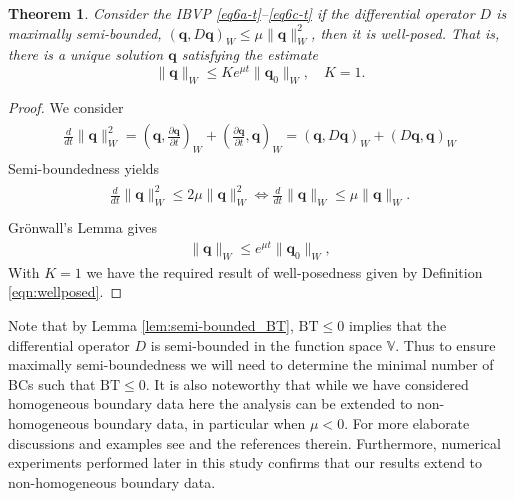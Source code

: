 \documentclass{article}
\numberwithin{equation}{section}
\newtheorem{theorem}{Theorem}
\theoremstyle{definition}
\begin{document}
\begin{theorem}\label{thm:swp}
    Consider the IBVP \eqref{eq6a-t}--\eqref{eq6c-t} if the differential operator $D$ is maximally semi-bounded, $(\mathbf{q}, D\mathbf{q})_W \leq \mu \|\mathbf{q}\|^2_W$, then it is  well-posed. That is, there is a unique solution $\mathbf{q}$ satisfying the estimate
    $$\| \mathbf{q}\|_W \leq K e^{\mu t}\| \mathbf{q}_0\|_W , \quad {K =1}.$$
\end{theorem}
\begin{proof}
    We consider 
\begin{align}
\begin{split}  
     \frac{d}{dt} \| \mathbf{q}\|_W^2   = \left(\mathbf{q},\frac{\partial\mathbf{q}}{\partial t}\right)_W  + \left(\frac{\partial\mathbf{q}}{\partial t}, \mathbf{q}\right)_W =\left(\mathbf{q},D\mathbf{q}\right)_W + \left(D\mathbf{q}, \mathbf{q}\right)_W  
\end{split}
    \end{align}
    Semi-boundedness  yields
\begin{align}
\begin{split}  
     \frac{d}{dt} \| \mathbf{q}\|_W^2   \leq 2\mu \| \mathbf{q} \|^2_W  \iff
    \frac{d}{dt} \| \mathbf{q} \|_W \leq  \mu \| \mathbf{q}\|_W . \\
\end{split}
    \end{align}
    Gr\"onwall's Lemma  gives
    \begin{align}
    \|\mathbf{q}\|_W \leq e^{\mu t}\|\mathbf{q}_0\|_W , 
\end{align}
With $K=1$ we have the required result of well-posedness given by Definition \ref{eqn:wellposed}.
\end{proof}
%
\noindent
Note that by Lemma \ref{lem:semi-bounded_BT}, $\mathrm{BT} \le 0$ implies that the differential operator $D$ is semi-bounded in the function space $\mathbb{V}$. Thus to ensure maximally semi-boundedness we will need to determine the minimal number of BCs such that $\mathrm{BT} \le 0$.
It is also noteworthy that while we have considered homogeneous boundary data here the analysis can be extended to non-homogeneous boundary data, in particular when $\mu < 0$. For more elaborate discussions and  examples see  \cite{nordstrom2022linear,GHADER20141,NORDSTROM2020112857} and the references therein. Furthermore, numerical experiments performed later in this study confirms that our results extend to non-homogeneous boundary data. 
%
\end{document}
